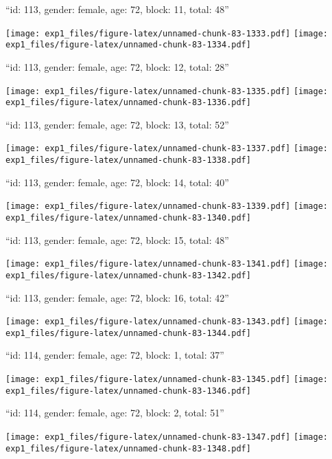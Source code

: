 \documentclass[11pt,,]{article}
\begin{document}
\newpage
[1] 

``id: 113, gender: female, age: 72, block: 11, total: 48''

\texttt{[image: exp1\_files/figure-latex/unnamed-chunk-83-1333.pdf]}
\texttt{[image: exp1\_files/figure-latex/unnamed-chunk-83-1334.pdf]}

\newpage
[1] 

``id: 113, gender: female, age: 72, block: 12, total: 28''

\texttt{[image: exp1\_files/figure-latex/unnamed-chunk-83-1335.pdf]}
\texttt{[image: exp1\_files/figure-latex/unnamed-chunk-83-1336.pdf]}

\newpage
[1] 

``id: 113, gender: female, age: 72, block: 13, total: 52''

\texttt{[image: exp1\_files/figure-latex/unnamed-chunk-83-1337.pdf]}
\texttt{[image: exp1\_files/figure-latex/unnamed-chunk-83-1338.pdf]}

\newpage
[1] 

``id: 113, gender: female, age: 72, block: 14, total: 40''

\texttt{[image: exp1\_files/figure-latex/unnamed-chunk-83-1339.pdf]}
\texttt{[image: exp1\_files/figure-latex/unnamed-chunk-83-1340.pdf]}

\newpage
[1] 

``id: 113, gender: female, age: 72, block: 15, total: 48''

\texttt{[image: exp1\_files/figure-latex/unnamed-chunk-83-1341.pdf]}
\texttt{[image: exp1\_files/figure-latex/unnamed-chunk-83-1342.pdf]}

\newpage
[1] 

``id: 113, gender: female, age: 72, block: 16, total: 42''

\texttt{[image: exp1\_files/figure-latex/unnamed-chunk-83-1343.pdf]}
\texttt{[image: exp1\_files/figure-latex/unnamed-chunk-83-1344.pdf]}

\newpage
[1] 

``id: 114, gender: female, age: 72, block: 1, total: 37''

\texttt{[image: exp1\_files/figure-latex/unnamed-chunk-83-1345.pdf]}
\texttt{[image: exp1\_files/figure-latex/unnamed-chunk-83-1346.pdf]}

\newpage
[1] 

``id: 114, gender: female, age: 72, block: 2, total: 51''

\texttt{[image: exp1\_files/figure-latex/unnamed-chunk-83-1347.pdf]}
\texttt{[image: exp1\_files/figure-latex/unnamed-chunk-83-1348.pdf]}
\end{document}
